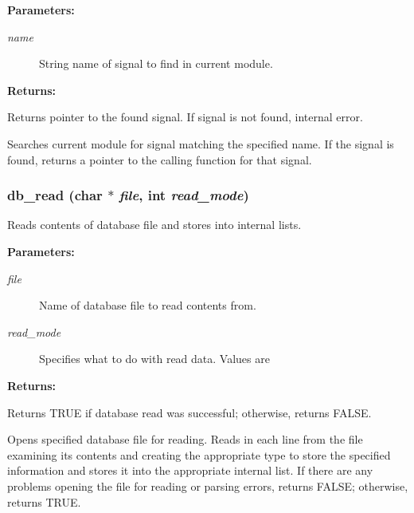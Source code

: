 \begin{Desc}
\item[{\bf Parameters: }]\par
\begin{description}
\item[
{\em name}]String name of signal to find in current module.

\end{description}
\end{Desc}
\begin{Desc}
\item[{\bf Returns: }]\par
Returns pointer to the found signal. If signal is not found, internal error.

\end{Desc}
Searches current module for signal matching the specified name. If the signal is found, returns a pointer to the calling function for that signal. 
\subsubsection{ db\_\-read (char $\ast$ {\em file}, int {\em read\_\-mode})}\label{db_8c_a18}


Reads contents of database file and stores into internal lists.

\begin{Desc}
\item[{\bf Parameters: }]\par
\begin{description}
\item[
{\em file}]Name of database file to read contents from. \item[
{\em read\_\-mode}]Specifies what to do with read data. Values are
\end{description}
\end{Desc}
\begin{Desc}
\item[{\bf Returns: }]\par
Returns TRUE if database read was successful; otherwise, returns FALSE.

\end{Desc}
Opens specified database file for reading. Reads in each line from the file examining its contents and creating the appropriate type to store the specified information and stores it into the appropriate internal list. If there are any problems opening the file for reading or parsing errors, returns FALSE; otherwise, returns TRUE. 
